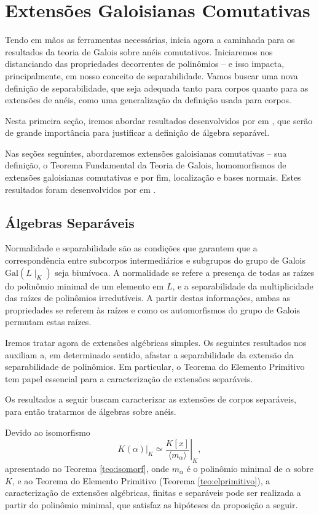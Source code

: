 \chapter{Extensões Galoisianas Comutativas}
Tendo em mãos as ferramentas necessárias, inicia agora a caminhada para os resultados da teoria de Galois sobre anéis comutativos. Iniciaremos nos distanciando das propriedades decorrentes de polinômios -- e isso impacta, principalmente, em nosso conceito de separabilidade. Vamos buscar uma nova definição de separabilidade, que seja adequada tanto para corpos quanto para as extensões de anéis, como uma generalização da definição usada para corpos. \par
Nesta primeira seção, iremos abordar resultados desenvolvidos por \citeauthor{paques} em \cite{paques}, que serão de grande importância para justificar a definição de álgebra separável. \par
Nas seções seguintes, abordaremos extensões galoisianas comutativas -- sua definição, o Teorema Fundamental da Teoria de Galois, homomorfismos de extensões galoisianas comutativas e por fim, localização e bases normais. Estes resultados foram desenvolvidos por \citeauthor*{chr} em \cite{chr}.


\section{Álgebras Separáveis} \label{sec:algsep}
Normalidade e separabilidade são as condições que garantem que a correspondência entre subcorpos intermediários e subgrupos do grupo de Galois $\textrm{Gal}\left(L\mid_K\right)$ seja biunívoca. A normalidade se refere a presença de todas as raízes do polinômio minimal de um elemento em $L$, e a separabilidade da multiplicidade das raízes de polinômios irredutíveis. A partir destas informações, ambas as propriedades se referem às raízes e como os automorfismos do grupo de Galois permutam estas raízes. \par 
Iremos tratar agora de extensões algébricas simples. Os seguintes resultados nos auxiliam a, em determinado sentido, afastar a separabilidade da extensão da separabilidade de polinômios. Em particular, o Teorema do Elemento Primitivo tem papel essencial para a caracterização de extensões separáveis. \par
Os resultados a seguir buscam caracterizar as extensões de corpos separáveis, para então tratarmos de álgebras sobre anéis. \par 
Devido ao isomorfismo \[\left. K(\alpha) \right|_K\simeq \left.  \displaystyle\frac{K[x]}{\langle m_\alpha\rangle} \right|_K,\] apresentado no Teorema \ref{teo:isomorf}, onde $m_\alpha$ é o polinômio minimal de $\alpha$ sobre $K$, e ao Teorema do Elemento Primitivo (Teorema \ref{teo:elprimitivo}), a caracterização de extensões algébricas, finitas e separáveis pode ser realizada a partir do polinômio minimal, que satisfaz as hipóteses da proposição a seguir.

